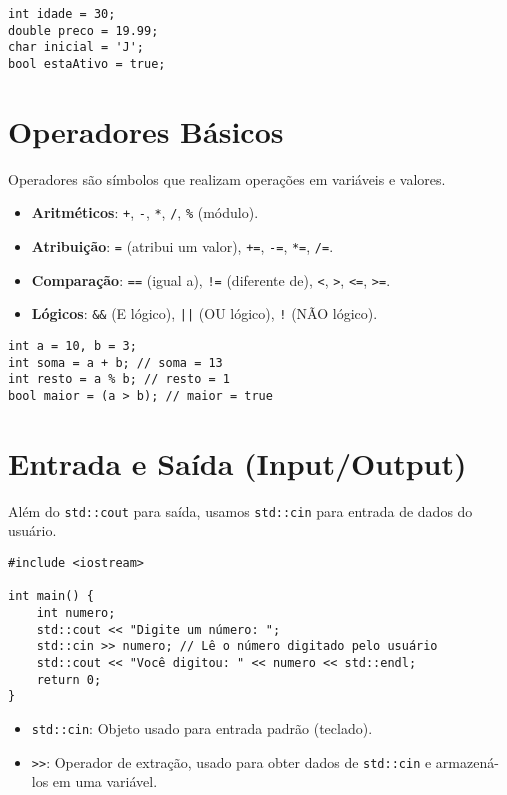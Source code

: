 \documentclass{article}
\begin{document}
\begin{lstlisting}[caption={Exemplo de Declaração de Variáveis}]
int idade = 30;
double preco = 19.99;
char inicial = 'J';
bool estaAtivo = true;
\end{lstlisting}

\section{Operadores Básicos}
Operadores são símbolos que realizam operações em variáveis e valores.
\begin{itemize}
    \item \textbf{Aritméticos}: \texttt{+}, \texttt{-}, \texttt{*}, \texttt{/}, \texttt{\%} (módulo).
    \item \textbf{Atribuição}: \texttt{=} (atribui um valor), \texttt{+=}, \texttt{-=}, \texttt{*=}, \texttt{/=}.
    \item \textbf{Comparação}: \texttt{==} (igual a), \texttt{!=} (diferente de), \texttt{<}, \texttt{>}, \texttt{<=}, \texttt{>=}.
    \item \textbf{Lógicos}: \texttt{&&} (E lógico), \texttt{||} (OU lógico), \texttt{!} (NÃO lógico).
\end{itemize}

\begin{lstlisting}[caption={Exemplo de Operadores}]
int a = 10, b = 3;
int soma = a + b; // soma = 13
int resto = a % b; // resto = 1
bool maior = (a > b); // maior = true
\end{lstlisting}

\section{Entrada e Saída (Input/Output)}
Além do \texttt{std::cout} para saída, usamos \texttt{std::cin} para entrada de dados do usuário.

\begin{lstlisting}[caption={Exemplo de Entrada/Saída}]
#include <iostream>

int main() {
    int numero;
    std::cout << "Digite um número: ";
    std::cin >> numero; // Lê o número digitado pelo usuário
    std::cout << "Você digitou: " << numero << std::endl;
    return 0;
}
\end{lstlisting}
\begin{itemize}
    \item \texttt{std::cin}: Objeto usado para entrada padrão (teclado).
    \item \texttt{>>}: Operador de extração, usado para obter dados de \texttt{std::cin} e armazená-los em uma variável.
\end{itemize}
\end{document}
